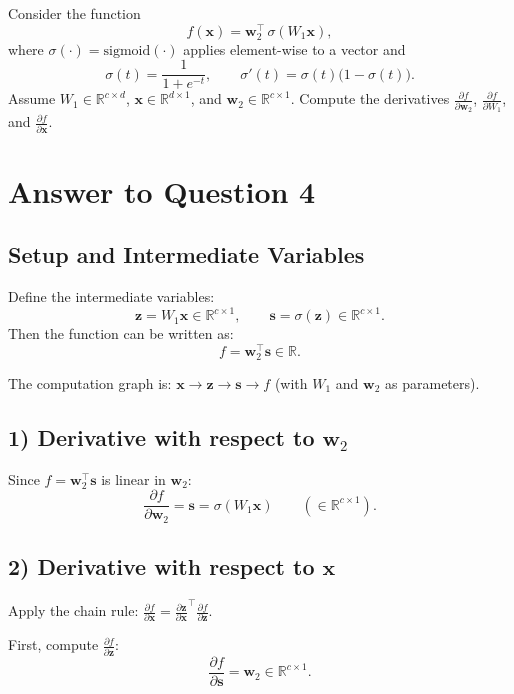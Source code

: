 \documentclass{article}
\begin{document}
Consider the function
\[
f(\mathbf{x})=\mathbf{w}_2^\top \,\sigma(W_1 \mathbf{x}),
\]
where $\sigma(\cdot)=\text{sigmoid}(\cdot)$ applies element-wise to a vector and
\[
\sigma(t)=\frac{1}{1+e^{-t}}, \qquad \sigma'(t)=\sigma(t)\bigl(1-\sigma(t)\bigr).
\]
Assume $W_1\in\mathbb{R}^{c\times d}$, $\mathbf{x}\in\mathbb{R}^{d\times 1}$, and $\mathbf{w}_2\in\mathbb{R}^{c\times 1}$.
Compute the derivatives $\frac{\partial f}{\partial \mathbf{w}_2}$, $\frac{\partial f}{\partial W_1}$, and $\frac{\partial f}{\partial \mathbf{x}}$.

\section*{Answer to Question 4}

\subsection*{Setup and Intermediate Variables}

Define the intermediate variables:
\[
\mathbf{z} = W_1 \mathbf{x} \in \mathbb{R}^{c\times 1}, \qquad \mathbf{s}=\sigma(\mathbf{z})\in\mathbb{R}^{c\times 1}.
\]
Then the function can be written as:
\[
f = \mathbf{w}_2^\top \mathbf{s} \in \mathbb{R}.
\]

The computation graph is: $\mathbf{x} \to \mathbf{z} \to \mathbf{s} \to f$ (with $W_1$ and $\mathbf{w}_2$ as parameters).

\subsection*{1) Derivative with respect to $\mathbf{w}_2$}

Since $f = \mathbf{w}_2^\top \mathbf{s}$ is linear in $\mathbf{w}_2$:
\[
\boxed{\frac{\partial f}{\partial \mathbf{w}_2} = \mathbf{s} = \sigma(W_1 \mathbf{x})}
\qquad (\in \mathbb{R}^{c\times 1}).
\]

\subsection*{2) Derivative with respect to $\mathbf{x}$}

Apply the chain rule: $\frac{\partial f}{\partial \mathbf{x}} = \frac{\partial \mathbf{z}}{\partial \mathbf{x}}^\top \frac{\partial f}{\partial \mathbf{z}}$.

First, compute $\frac{\partial f}{\partial \mathbf{z}}$:
\[
\frac{\partial f}{\partial \mathbf{s}} = \mathbf{w}_2 \in \mathbb{R}^{c\times 1}.
\]
\end{document}
